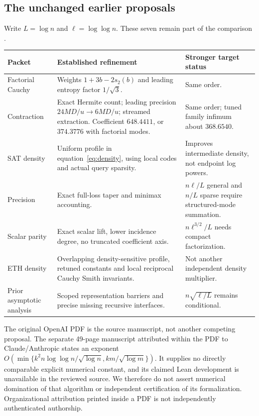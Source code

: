 \subsection{The unchanged earlier proposals}
Write $L=\log n$ and $\ell=\log\log n$. These seven remain part of the comparison \cite{old,round2}.
\begin{longtable}{@{}>{\raggedright\arraybackslash}p{}>{\raggedright\arraybackslash}p{}>{\raggedright\arraybackslash}p{}@{}}
\toprule
Packet & Established refinement & Stronger target status\\\midrule\endhead
Factorial Cauchy & Weights $1+3b-2s_2(b)$ and leading entropy factor $1/\sqrt3$. & Same order.\\[4pt]
Contraction & Exact Hermite count; leading precision $24MD/u\to6MD/u$; streamed extraction. Coefficient $648.4411$, or $374.3776$ with factorial modes. & Same order; tuned family infimum about $368.6540$.\\[4pt]
SAT density & Uniform profile in equation~\eqref{eq:density}, using local codes and actual query sparsity. & Improves intermediate density, not endpoint log powers.\\[4pt]
Precision & Exact full-loss taper and minimax accounting. & $n\ell/L$ general and $n/L$ sparse require structured-mode summation.\\[4pt]
Scalar parity & Exact scalar lift, lower incidence degree, no truncated coefficient axis. & $n\ell^{3/2}/L$ needs compact factorization.\\[4pt]
ETH density & Overlapping density-sensitive profile, retuned constants and local reciprocal Cauchy Smith invariants. & Not another independent density multiplier.\\[4pt]
Prior asymptotic analysis & Scoped representation barriers and precise missing recursive interfaces. & $n\sqrt{\ell/L}$ remains conditional.\\\bottomrule
\end{longtable}
The original OpenAI PDF is the source manuscript, not another competing proposal. The separate 49-page manuscript attributed within the PDF to Claude/Anthropic states an exponent
$O(\min\{k^2n\log\log n/\sqrt{\log n},km/\sqrt{\log m}\})$.
It supplies no directly comparable explicit numerical constant, and its claimed Lean development is unavailable in the reviewed source. We therefore do not assert numerical domination of that algorithm or independent certification of its formalization. Organizational attribution printed inside a PDF is not independently authenticated authorship.

